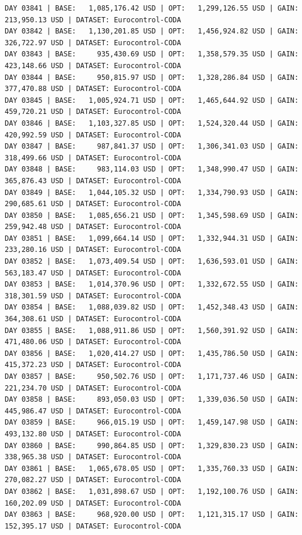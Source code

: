 \documentclass[11pt,a4paper]{article}
\begin{document}
\begin{verbatim}
DAY 03841 | BASE:   1,085,176.42 USD | OPT:   1,299,126.55 USD | GAIN: 213,950.13 USD | DATASET: Eurocontrol-CODA
DAY 03842 | BASE:   1,130,201.85 USD | OPT:   1,456,924.82 USD | GAIN: 326,722.97 USD | DATASET: Eurocontrol-CODA
DAY 03843 | BASE:     935,430.69 USD | OPT:   1,358,579.35 USD | GAIN: 423,148.66 USD | DATASET: Eurocontrol-CODA
DAY 03844 | BASE:     950,815.97 USD | OPT:   1,328,286.84 USD | GAIN: 377,470.88 USD | DATASET: Eurocontrol-CODA
DAY 03845 | BASE:   1,005,924.71 USD | OPT:   1,465,644.92 USD | GAIN: 459,720.21 USD | DATASET: Eurocontrol-CODA
DAY 03846 | BASE:   1,103,327.85 USD | OPT:   1,524,320.44 USD | GAIN: 420,992.59 USD | DATASET: Eurocontrol-CODA
DAY 03847 | BASE:     987,841.37 USD | OPT:   1,306,341.03 USD | GAIN: 318,499.66 USD | DATASET: Eurocontrol-CODA
DAY 03848 | BASE:     983,114.03 USD | OPT:   1,348,990.47 USD | GAIN: 365,876.43 USD | DATASET: Eurocontrol-CODA
DAY 03849 | BASE:   1,044,105.32 USD | OPT:   1,334,790.93 USD | GAIN: 290,685.61 USD | DATASET: Eurocontrol-CODA
DAY 03850 | BASE:   1,085,656.21 USD | OPT:   1,345,598.69 USD | GAIN: 259,942.48 USD | DATASET: Eurocontrol-CODA
DAY 03851 | BASE:   1,099,664.14 USD | OPT:   1,332,944.31 USD | GAIN: 233,280.16 USD | DATASET: Eurocontrol-CODA
DAY 03852 | BASE:   1,073,409.54 USD | OPT:   1,636,593.01 USD | GAIN: 563,183.47 USD | DATASET: Eurocontrol-CODA
DAY 03853 | BASE:   1,014,370.96 USD | OPT:   1,332,672.55 USD | GAIN: 318,301.59 USD | DATASET: Eurocontrol-CODA
DAY 03854 | BASE:   1,088,039.82 USD | OPT:   1,452,348.43 USD | GAIN: 364,308.61 USD | DATASET: Eurocontrol-CODA
DAY 03855 | BASE:   1,088,911.86 USD | OPT:   1,560,391.92 USD | GAIN: 471,480.06 USD | DATASET: Eurocontrol-CODA
DAY 03856 | BASE:   1,020,414.27 USD | OPT:   1,435,786.50 USD | GAIN: 415,372.23 USD | DATASET: Eurocontrol-CODA
DAY 03857 | BASE:     950,502.76 USD | OPT:   1,171,737.46 USD | GAIN: 221,234.70 USD | DATASET: Eurocontrol-CODA
DAY 03858 | BASE:     893,050.03 USD | OPT:   1,339,036.50 USD | GAIN: 445,986.47 USD | DATASET: Eurocontrol-CODA
DAY 03859 | BASE:     966,015.19 USD | OPT:   1,459,147.98 USD | GAIN: 493,132.80 USD | DATASET: Eurocontrol-CODA
DAY 03860 | BASE:     990,864.85 USD | OPT:   1,329,830.23 USD | GAIN: 338,965.38 USD | DATASET: Eurocontrol-CODA
DAY 03861 | BASE:   1,065,678.05 USD | OPT:   1,335,760.33 USD | GAIN: 270,082.27 USD | DATASET: Eurocontrol-CODA
DAY 03862 | BASE:   1,031,898.67 USD | OPT:   1,192,100.76 USD | GAIN: 160,202.09 USD | DATASET: Eurocontrol-CODA
DAY 03863 | BASE:     968,920.00 USD | OPT:   1,121,315.17 USD | GAIN: 152,395.17 USD | DATASET: Eurocontrol-CODA

\end{verbatim}
\end{document}
